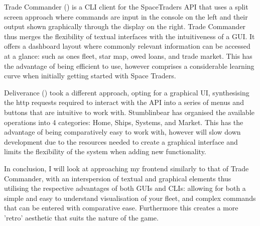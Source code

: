 
Trade Commander (\textcite{tradecommander}) is a CLI client for the SpaceTraders API that uses a split screen approach where commands are input in the console on the left and their output shown graphically through the display on the right. Trade Commander thus merges the flexibility of textual interfaces with the intuitiveness of a GUI. It offers a dashboard layout where commonly relevant information can be accessed at a glance: such as ones fleet, star map, owed loans, and trade market. This has the advantage of being efficient to use, however comprises a considerable learning curve when initially getting started with Space Traders.  

\bigskip
{}

Deliverance (\textcite{deliverance}) took a different approach, opting for a graphical UI, synthesising the http requests required to interact with the API into a series of menus and buttons that are intuitive to work with. Stumblinbear has organised the available operations into 4 categories: Home, Ships, Systems, and Market. This has the advantage of being comparatively easy to work with, however will slow down development due to the resources needed to create a graphical interface and limits the flexibility of the system when adding new functionality.

In conclusion, I will look at approaching my frontend similarly to that of Trade Commander, with an interspersion of textual and graphical elements thus utilising the respective advantages of both GUIs and CLIs: allowing for both a simple and easy to understand visualisation of your fleet, and complex commands that can be entered with comparative ease. Furthermore this creates a more 'retro' aesthetic that suits the nature of the game. 

